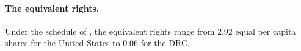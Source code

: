 \documentclass[12pt,english]{article}
\theoremstyle{remark}
\begin{document}




\paragraph{The equivalent rights.} Under the schedule of \citet{banerjee_grand_2025}, the equivalent rights range from 2.92 equal per capita shares for the United States to 0.06 for the DRC. 
\end{document}
